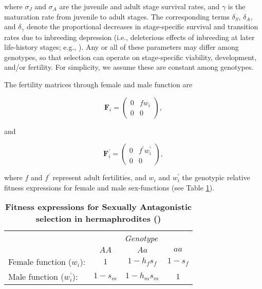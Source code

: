 \documentclass[11pt]{article}
\def\mbf#1{\mathbf{#1}}
\begin{document}
\noindent where $\sigma_J$ and $\sigma_A$ are the juvenile and adult stage survival rates, and $\gamma$ is the maturation rate from juvenile to adult stages. The corresponding terms $\delta_S$, $\delta_A$, and $\delta_{\gamma}$ denote the proportional decreases in stage-specific survival and transition rates due to inbreeding depression (i.e., deleterious effects of inbreeding at later life-history stages; e.g., \citealt{HarderRoutely2006}). Any or all of these parameters may differ among genotypes, so that selection can operate on stage-specific viability, development, and/or fertility. For simplicity, we assume these are constant among genotypes. 

The fertility matrices through female and male function are
\begin{linenomath*}
\begin{equation}\label{eq:FS}
	\mbf{F}_{i} = \left(
					\begin{array}{cc}
						0 & f w_{i} \\
						0 & 0
					\end{array}
				\right),
\end{equation}
\end{linenomath*}
\noindent and
\begin{linenomath*}
\begin{equation}\label{eq:FX}
	\mbf{F}^{\prime}_{i} = \left(
					\begin{array}{cc}
						0 & f^{\prime} w^{\prime}_{i} \\
						0 & 0
					\end{array}
				\right),
\end{equation}
\end{linenomath*}

\noindent where $f$ and $f^{\prime}$ represent adult fertilities, and $w_{i}$ and $w^{\prime}_{i}$ the genotypic relative fitness expressions for female and male sex-functions (see Table \ref{tab:Fitness}). 

\begin{table}[htbp]
 \centering
 \caption{\bf Fitness expressions for Sexually Antagonistic selection in hermaphrodites ()}
\label{tab:Fitness}
\begin{tabular}{lccc}
 \toprule
					&  \multicolumn{3}{c}{{\textit{Genotype}}} \\ 
\cline{2-4}
					& $AA$			& $Aa$ 					& $aa$ 		\\ \hline
Female function ($w_{i}$):	& $1$		& $1 - h_f s_f$	& $1 - s_f$ \\	
Male function ($w^{\prime}_{i}$):		& $1 - s_m$& $1 - h_m s_m$	& $1$ 		\\	
\hline
\end{tabular}
\end{table}
\end{document}
